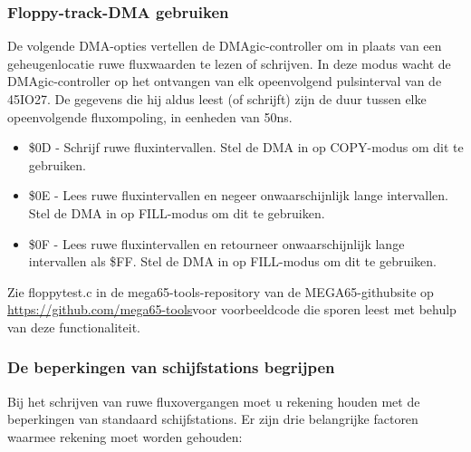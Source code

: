 \subsubsection{Floppy-track-DMA gebruiken}

De volgende DMA-opties vertellen de DMAgic-controller om in plaats van een geheugenlocatie ruwe fluxwaarden te lezen of schrijven. In deze modus wacht de DMAgic-controller op het ontvangen van elk opeenvolgend pulsinterval van de 45IO27. De gegevens die hij aldus leest (of schrijft) zijn de duur tussen elke opeenvolgende fluxompoling, in eenheden van 50ns.

\begin{itemize}
\item \$0D - Schrijf ruwe fluxintervallen. Stel de DMA in op COPY-modus om dit te gebruiken.\item \$0E - Lees ruwe fluxintervallen en negeer onwaarschijnlijk lange intervallen. Stel de DMA in op FILL-modus om dit te gebruiken.\item \$0F - Lees ruwe fluxintervallen en retourneer onwaarschijnlijk lange intervallen als \$FF. Stel de DMA in op FILL-modus om dit te gebruiken.
\end{itemize}

Zie floppytest.c in de mega65-tools-repository van de MEGA65-githubsite op \url{https://github.com/mega65-tools}voor voorbeeldcode die sporen leest met behulp van deze functionaliteit.

\subsubsection{De beperkingen van schijfstations begrijpen}

Bij het schrijven van ruwe fluxovergangen moet u rekening houden met de beperkingen van standaard schijfstations. Er zijn drie belangrijke factoren waarmee rekening moet worden gehouden:

